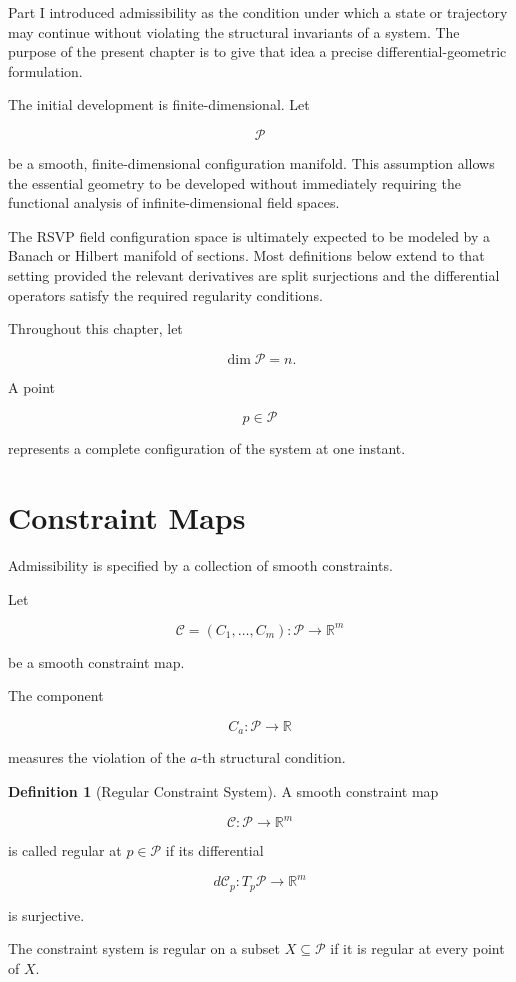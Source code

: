 \documentclass[11pt,oneside]{book}
\numberwithin{equation}{chapter}
\theoremstyle{definition}
\newtheorem{definition}{Definition}[chapter]
\theoremstyle{plain}
\begin{document}
Part I introduced admissibility as the condition under which a state or
trajectory may continue without violating the structural invariants of a
system. The purpose of the present chapter is to give that idea a precise
differential-geometric formulation.

The initial development is finite-dimensional. Let

\[
\mathcal P
\]

be a smooth, finite-dimensional configuration manifold. This assumption
allows the essential geometry to be developed without immediately requiring
the functional analysis of infinite-dimensional field spaces.

The RSVP field configuration space is ultimately expected to be modeled by a
Banach or Hilbert manifold of sections. Most definitions below extend to
that setting provided the relevant derivatives are split surjections and the
differential operators satisfy the required regularity conditions.

Throughout this chapter, let

\[
\dim \mathcal P=n.
\]

A point

\[
p\in\mathcal P
\]

represents a complete configuration of the system at one instant.

\section{Constraint Maps}

Admissibility is specified by a collection of smooth constraints.

Let

\[
\mathcal C
=
(C_1,\ldots,C_m):
\mathcal P
\longrightarrow
\mathbb R^m
\]

be a smooth constraint map.

The component

\[
C_a:\mathcal P\longrightarrow\mathbb R
\]

measures the violation of the \(a\)-th structural condition.

\begin{definition}[Regular Constraint System]

A smooth constraint map

\[
\mathcal C:\mathcal P\longrightarrow\mathbb R^m
\]

is called regular at \(p\in\mathcal P\) if its differential

\[
d\mathcal C_p:
T_p\mathcal P
\longrightarrow
\mathbb R^m
\]

is surjective.

The constraint system is regular on a subset
\(X\subseteq\mathcal P\) if it is regular at every point of \(X\).

\end{definition}
\end{document}
